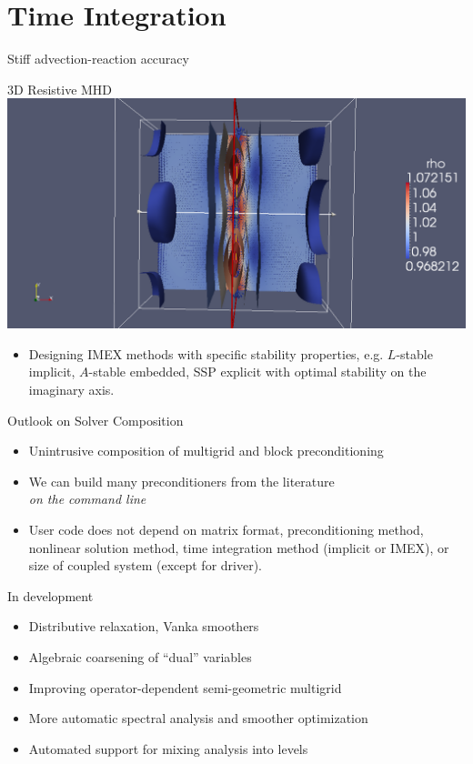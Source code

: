 \documentclass{beamer}
\begin{document}


\section{Time Integration}


\begin{frame}{Stiff advection-reaction accuracy}
  
\end{frame}
\begin{frame}{3D Resistive MHD}
  \includegraphics[width=\textwidth]{figures/MHD.png}
  \begin{itemize}
  \item Designing IMEX methods with specific stability properties, e.g. $L$-stable implicit, $A$-stable embedded, SSP explicit with optimal stability on the imaginary axis.
  \end{itemize}
\end{frame}

\begin{frame}{Outlook on Solver Composition}
  \begin{itemize}
  \item Unintrusive composition of multigrid and block preconditioning
  \item We can build many preconditioners from the literature \\
    \emph{on the command line}
  \item User code does not depend on matrix format, preconditioning method, nonlinear solution method, time integration method (implicit or IMEX), or size of coupled system (except for driver).
  \end{itemize}
  \begin{block}{In development}
    \begin{itemize}
    \item Distributive relaxation, Vanka smoothers
    \item Algebraic coarsening of ``dual'' variables
    \item Improving operator-dependent semi-geometric multigrid
    \item More automatic spectral analysis and smoother optimization
    \item Automated support for mixing analysis into levels
  \end{itemize}
\end{block}
\end{frame}
\end{document}
